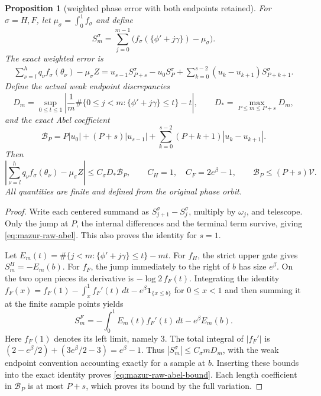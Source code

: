 \documentclass[11pt]{article}
\newtheorem{proposition}{Proposition}
\theoremstyle{remark}\newtheorem{remark}[proposition]{Remark}
\begin{document}
\begin{proposition}[weighted phase error with both endpoints retained]
\label{prop:mazur-raw-abel}
For $\sigma=H,F$, let $\mu_\sigma=\int_0^1f_\sigma$ and define
\[
 S_m^\sigma=\sum_{j=0}^{m-1}
       \big(f_\sigma(\{\phi'+j\gamma\})-\mu_\sigma\big).
\]
The exact weighted error is
\begin{align}
 \sum_{\nu=l}^h q_\nu f_\sigma(\theta_\nu)-\mu_\sigma Z
 =u_{s-1}S_{P+s}^\sigma-u_0S_P^\sigma
       +\sum_{k=0}^{s-2}(u_k-u_{k+1})S_{P+k+1}^\sigma .
 \label{eq:mazur-raw-abel}
\end{align}
Define the actual weak endpoint discrepancies
\[
 D_m=\sup_{0\le t\le1}
 \left|\frac1m\#\{0\le j<m:\{\phi'+j\gamma\}\le t\}-t\right|,
 \qquad D_*=\max_{P\le m\le P+s}D_m ,
\]
and the exact Abel coefficient
\[
 \mathcal B_P=P|u_0|+(P+s)|u_{s-1}|
       +\sum_{k=0}^{s-2}(P+k+1)|u_k-u_{k+1}|.
\]
Then
\begin{equation}
 \left|\sum_{\nu=l}^h q_\nu f_\sigma(\theta_\nu)-\mu_\sigma Z\right|
 \le C_\sigma D_*\mathcal B_P,\qquad
 C_H=1,\quad C_F=2e^\beta-1,\qquad
 \mathcal B_P\le(P+s)\mathcal V .
 \label{eq:mazur-raw-abel-bound}
\end{equation}
All quantities are finite and defined from the original phase orbit.
\end{proposition}
\begin{proof}
Write each centered summand as $S_{j+1}^\sigma-S_j^\sigma$,
multiply by $\omega_j$, and telescope. Only the jump at $P$,
the internal differences and the terminal term survive, giving
\eqref{eq:mazur-raw-abel}. This also proves the identity for $s=1$.

Let $E_m(t)=\#\{j<m:\{\phi'+j\gamma\}\le t\}-mt$.
For $f_H$, the strict upper gate gives $S_m^H=-E_m(b)$.
For $f_F$, the jump immediately to the right of $b$ has size $e^\beta$.
On the two open pieces its derivative is $-\log2\,f_F(t)$.
Integrating the identity
$f_F(x)=f_F(1)-\int_x^1 f_F'(t)\,dt
-e^\beta\mathbf1_{\{x\le b\}}$ for $0\le x<1$
and then summing it at the finite sample points yields
\[
 S_m^F=-\int_0^1 E_m(t)f_F'(t)\,dt-e^\beta E_m(b).
\]
Here $f_F(1)$ denotes its left limit, namely $3$.
The total integral of $|f_F'|$ is
$(2-e^\beta/2)+(3e^\beta/2-3)=e^\beta-1$.
Thus $|S_m^\sigma|\le C_\sigma mD_m$, with the weak
endpoint convention accounting exactly for a sample at $b$.
Inserting these bounds into the exact identity proves
\eqref{eq:mazur-raw-abel-bound}.
Each length coefficient in $\mathcal B_P$ is at most $P+s$,
which proves its bound by the full variation.
\end{proof}
\end{document}
